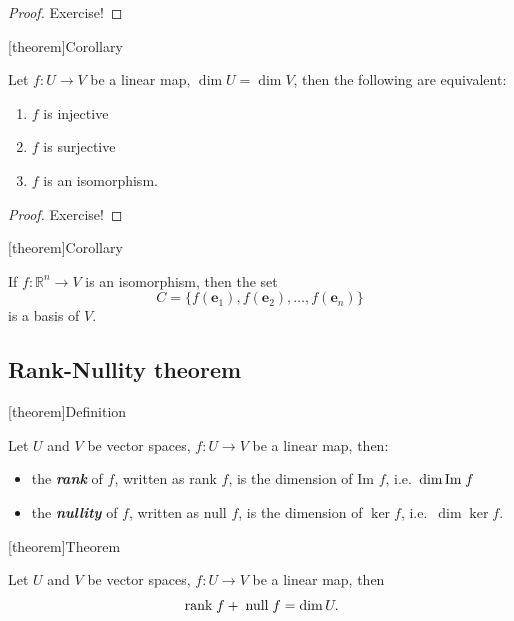 \documentclass[12pt]{report}
\theoremstyle{definition}
\begin{document}
\begin{proof}
    Exercise!
\end{proof}

[theorem]{Corollary}
\begin{linear map over two V of same dim}
    Let $f:U\rightarrow{}V$ be a linear map, $\dim{U} = \dim{V}$, then the following are equivalent:
    \begin{enumerate}[label = (\roman*)]
        \item $f$ is injective
        \item $f$ is surjective
        \item $f$ is an isomorphism.
    \end{enumerate}
\end{linear map over two V of same dim}

\begin{proof}
    Exercise!
\end{proof}

[theorem]{Corollary}
\begin{find basis in new vector space}
    If $f:\mathbb{R}^{n}\rightarrow{}V$ is an isomorphism, then the set\[
        C = \{f(\pmb{e}_1), f(\pmb{e}_2),\ldots, f(\pmb{e}_n)\}
    \]is a basis of $V$.
\end{find basis in new vector space}

\subsection{Rank-Nullity theorem}

[theorem]{Definition}
\begin{def of rank and nullity}
    Let $U$ and $V$ be vector spaces, $f:U\rightarrow{}V$ be a linear map, then:
    \begin{itemize}
        \item the \textbf{\emph{rank}} of $f$, written as rank $f$,
            is the dimension of Im $f$, i.e.\ $\dim{\textnormal{Im}\; f}$
        \item the \textbf{\emph{nullity}} of $f$, written as null $f$,
            is the dimension of $\ker{f}$, i.e.\ $\dim{\ker{f}}$.
    \end{itemize}
\end{def of rank and nullity}

[theorem]{Theorem}
\begin{rank-nullity theorem}
    Let $U$ and $V$ be vector spaces, $f:U\rightarrow{}V$ be a linear map, then\[
        \;\textnormal{rank}\;f + \;\textnormal{null}\;f = \dim{U}.
    \]
\end{rank-nullity theorem}
\end{document}

